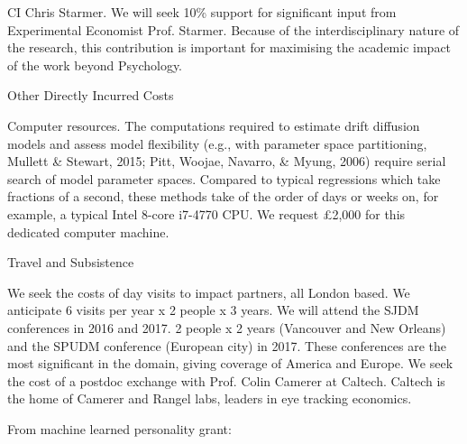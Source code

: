 CI Chris Starmer. We will seek 10\% support for significant input from Experimental
Economist Prof. Starmer. Because of the interdisciplinary nature of the research, this
contribution is important for maximising the academic impact of the work beyond
Psychology.


Other Directly Incurred Costs

Computer resources. The computations required to estimate drift diffusion models and assess
model flexibility (e.g., with parameter space partitioning, Mullett & Stewart, 2015; Pitt,
Woojae, Navarro, & Myung, 2006) require serial search of model parameter spaces.
Compared to typical regressions which take fractions of a second, these methods take of the
order of days or weeks on, for example, a typical Intel 8-core i7-4770 CPU. We request
£2,000 for this dedicated computer machine.

Travel and Subsistence

We seek the costs of day visits to impact partners, all London based. We anticipate 6 visits per year x 2 people x 3 years. We will attend the SJDM conferences in 2016 and 2017. 2
people x 2 years (Vancouver and New Orleans) and the SPUDM conference (European city)
in 2017. These conferences are the most significant in the domain, giving coverage of
America and Europe. We seek the cost of a postdoc exchange with Prof. Colin Camerer at
Caltech. Caltech is the home of Camerer and Rangel labs, leaders in eye tracking economics.




From machine learned personality grant:

